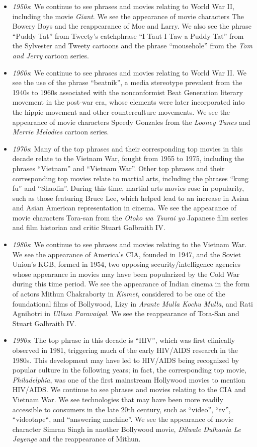 \documentclass{article}
\begin{document}
\begin{multicols}{2}
\begin{itemize}
    \item \textit{1950s}: We continue to see phrases and movies relating to World War II, including the movie \textit{Giant}. We see the appearance of movie characters The Bowery Boys and the reappearance of Moe and Larry. We also see the phrase ``Puddy Tat'' from Tweety's catchphrase ``I Taut I Taw a Puddy-Tat'' from the Sylvester and Tweety cartoons and the phrase ``mousehole'' from the \textit{Tom and Jerry} cartoon series.
    \item \textit{1960s}: We continue to see phrases and movies relating to World War II. We see the use of the phrase ``beatnik'', a media stereotype prevalent from the 1940s to 1960s associated with the nonconformist Beat Generation literary movement in the post-war era, whose elements were later incorporated into the hippie movement and other counterculture movements. We see the appearance of movie characters Speedy Gonzales from the \textit{Looney Tunes} and \textit{Merrie Melodies} cartoon series.
    \item \textit{1970s}: Many of the top phrases and their corresponding top movies in this decade relate to the Vietnam War, fought from 1955 to 1975, including the phrases ``Vietnam'' and ``Vietnam War''. Other top phrases and their corresponding top movies relate to martial arts, including the phrases ``kung fu'' and ``Shaolin''. During this time, martial arts movies rose in popularity, such as those featuring Bruce Lee, which helped lead to an increase in Asian and Asian American representation in cinema. We see the appearance of movie characters Tora-san from the \textit{Otoko wa Tsurai yo} Japanese film series and film historian and critic Stuart Galbraith IV.
    \item \textit{1980s}: We continue to see phrases and movies relating to the Vietnam War. We see the appearance of America's CIA, founded in 1947, and the Soviet Union's KGB, formed in 1954, two opposing security/intelligence agencies whose appearance in movies may have been popularized by the Cold War during this time period. We see the appearance of Indian cinema in the form of actors Mithun Chakraborty in \textit{Kismet}, considered to be one of the foundational films of Bollywood, Lizy in \textit{Arante Mulla Kochu Mulla}, and Rati Agnihotri in \textit{Ullasa Paravaigal}. We see the reappearance of Tora-San and Stuart Galbraith IV.
    \item \textit{1990s}: The top phrase in this decade is ``HIV'', which was first clinically observed in 1981, triggering much of the early HIV/AIDS research in the 1980s. This development may have led to HIV/AIDS being recognized by popular culture in the following years; in fact, the corresponding top movie, \textit{Philadelphia}, was one of the first mainstream Hollywood movies to mention HIV/AIDS. We continue to see phrases and movies relating to the CIA and Vietnam War. We see technologies that may have been more readily accessible to consumers in the late 20th century, such as ``video'', ``tv'', ``videotape``, and ``answering machine''. We see the appearance of movie character Simran Singh in another Bollywood movie, \textit{Dilwale Dulhania Le Jayenge} and the reappearance of Mithun.

\end{itemize}
\end{multicols}
\end{document}
